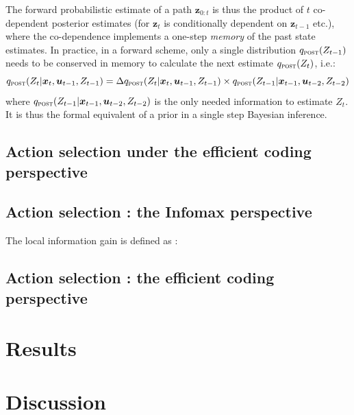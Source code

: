 \documentclass[12pt,twoside,openright]{article}
\begin{document}
The forward probabilistic estimate of a path $\boldsymbol{z}_{0:t}$ is thus the product of $t$ co-dependent posterior estimates (for $\boldsymbol{z}_t$ is conditionally dependent on $\boldsymbol{z}_{t-1}$ etc.), where the co-dependence implements a one-step \emph{memory} of the past state estimates. In practice, in a forward scheme, only a single distribution $q_\text{\sc post}(Z_{t-1})$ needs to be conserved in memory to calculate the next estimate $q_\text{\sc post}(Z_t)$, i.e.:
$$q_\text{\sc post}(Z_t|\boldsymbol{x}_t,\boldsymbol{u}_{t-1}, Z_{t-1}) = 
\Delta q_\text{\sc post}(Z_t|\boldsymbol{x}_t,\boldsymbol{u}_{t-1}, Z_{t-1}) 
\times q_\text{\sc post}(Z_{t-1}|\boldsymbol{x}_{t-1},\boldsymbol{u}_{t-2}, Z_{t-2})$$
where $q_\text{\sc post}(Z_{t-1}|\boldsymbol{x}_{t-1},\boldsymbol{u}_{t-2}, Z_{t-2})$ is the only needed information to estimate $Z_t$. It is thus the formal equivalent of a prior in a single step Bayesian inference.

\subsection{Action selection under the efficient coding perspective}


\subsection{Action selection : the Infomax perspective}

The local information gain is defined as :


\subsection{Action selection : the efficient coding perspective}

\section{Results}

\section{Discussion}



\end{document}
